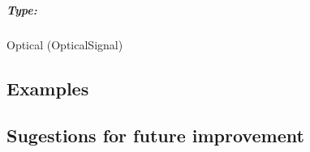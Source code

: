 \subparagraph*{Type:} Optical (OpticalSignal)

\subsection*{Examples} 


\subsection*{Sugestions for future improvement}
